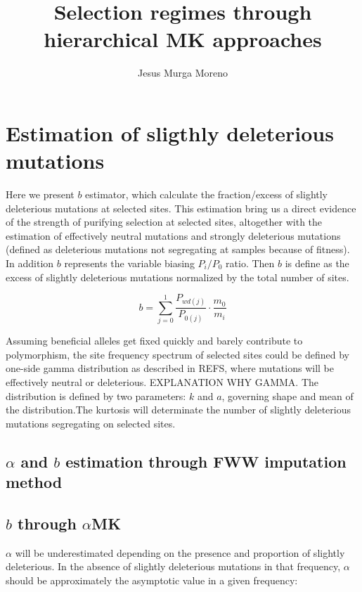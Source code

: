 \documentclass[11pt]{article}
\begin{document}
   

\title{Selection regimes through hierarchical MK approaches}    
\author{Jesus Murga Moreno}

\maketitle

\section{Estimation of sligthly deleterious mutations}    
	
	Here we present $b$ estimator, which calculate the fraction/excess of slightly deleterious mutations at selected sites. This estimation bring us a direct evidence of the strength of purifying selection at selected sites, altogether with the estimation of effectively neutral mutations and strongly deleterious mutations (defined as deleterious mutations not segregating at samples because of fitness). In addition $b$ represents the variable biasing $P_{i}/P_{0}$ ratio. Then $b$ is define as the excess of slightly deleterious mutations normalized by the total number of sites.
	
\begin{equation}
	b = \sum_{j=0}^{1}\frac{P_{wd(j)}}{P_{0(j)}}\cdot\frac{m_{0}}{m_{i}}
\end{equation}

Assuming beneficial alleles get fixed quickly and barely contribute to polymorphism, the site frequency spectrum of selected sites could be defined by one-side gamma distribution as described in REFS, where mutations will be effectively neutral or deleterious. EXPLANATION WHY GAMMA. The distribution is defined by two parameters: $k$ and $a$, governing shape and mean of the distribution.The kurtosis will determinate the number of slightly deleterious mutations segregating on selected sites. 

\subsection{$\alpha$ and $b$ estimation through FWW imputation method}

\subsection{$b$ through $\alpha$MK}
$\alpha$ will be underestimated depending on the presence and proportion of slightly deleterious. In the absence of slightly deleterious mutations in that frequency, $\alpha$ should be approximately the asymptotic value in a given frequency:
\end{document}
